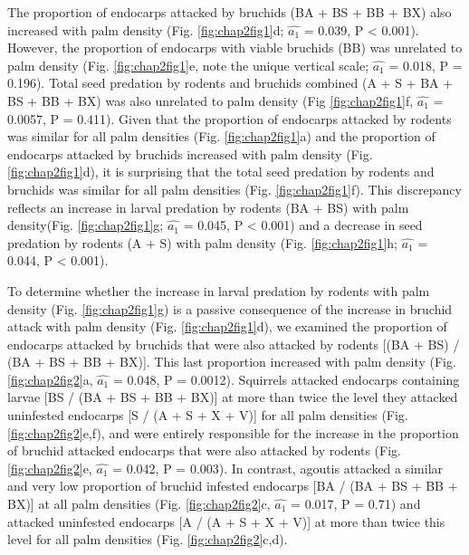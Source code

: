 \documentclass[b5paper,justified]{tufte-book} %
\begin{document}
\begin{fullwidth}
The proportion of endocarps attacked by bruchids (BA + BS + BB + BX) also increased with palm density (Fig. \ref{fig:chap2fig1}d; $\hat{a_1} $  = 0.039, P < 0.001). However, the proportion of endocarps with viable bruchids (BB) was unrelated to palm density (Fig. \ref{fig:chap2fig1}e, note the unique vertical scale; $\hat{a_1} $  =  0.018, P = 0.196). Total seed predation by rodents and bruchids combined (A + S + BA + BS + BB + BX) was also unrelated to palm density (Fig \ref{fig:chap2fig1}f, $\hat{a_1} $  = 0.0057, P = 0.411). Given that the proportion of endocarps attacked by rodents was similar for all palm densities (Fig. \ref{fig:chap2fig1}a) and the proportion of endocarps attacked by bruchids increased with palm density (Fig.  \ref{fig:chap2fig1}d), it is surprising that the total seed predation by rodents and bruchids was similar for all palm densities (Fig. \ref{fig:chap2fig1}f). This discrepancy reflects an increase in larval predation by rodents (BA + BS) with palm density(Fig. \ref{fig:chap2fig1}g; $\hat{a_1} $ = 0.045, P < 0.001) and a decrease in seed predation by rodents (A + S) with palm density (Fig.  \ref{fig:chap2fig1}h; $\hat{a_1} $ = 0.044, P < 0.001).

To determine whether the increase in larval predation by rodents with palm density (Fig. \ref{fig:chap2fig1}g) is a passive consequence of the increase in bruchid attack with palm density (Fig. \ref{fig:chap2fig1}d), we examined the proportion of endocarps attacked by bruchids that were also attacked by rodents [(BA + BS) / (BA + BS + BB + BX)]. This last proportion increased with palm density (Fig. \ref{fig:chap2fig2}a, $\hat{a_1} $ = 0.048, P = 0.0012). Squirrels attacked endocarps containing larvae [BS / (BA + BS + BB + BX)] at more than twice the level they attacked uninfested endocarps [S / (A + S + X + V)] for all palm densities (Fig. \ref{fig:chap2fig2}e,f), and were entirely responsible for the increase in the proportion of bruchid attacked endocarps that were also attacked by rodents (Fig. \ref{fig:chap2fig2}e, $\hat{a_1} $ = 0.042, P = 0.003). In contrast, agoutis attacked a similar and very low proportion of bruchid infested endocarps [BA / (BA + BS + BB + BX)] at all palm densities (Fig. \ref{fig:chap2fig2}c, $\hat{a_1} $ = 0.017, P = 0.71) and attacked uninfested endocarps [A / (A + S + X + V)] at more than twice this level for all palm densities (Fig. \ref{fig:chap2fig2}c,d).



\end{fullwidth}
\end{document}

